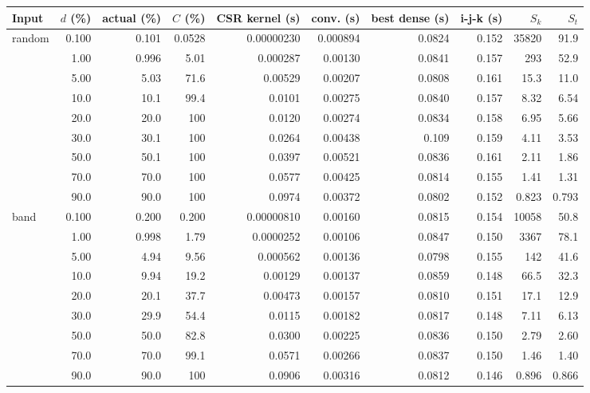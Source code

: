 \begin{tabular}{lrrrrrrrrr}
\toprule
Input & $d$ (\%) & actual (\%) & $C$ (\%) & CSR kernel (s) & conv. (s) & best dense (s) & i-j-k (s) & $S_k$ & $S_t$ \\
\midrule
random & 0.100 & 0.101 & 0.0528 & 0.00000230 & 0.000894 & 0.0824 & 0.152 & 35820 & 91.9 \\
 & 1.00 & 0.996 & 5.01 & 0.000287 & 0.00130 & 0.0841 & 0.157 & 293 & 52.9 \\
 & 5.00 & 5.03 & 71.6 & 0.00529 & 0.00207 & 0.0808 & 0.161 & 15.3 & 11.0 \\
 & 10.0 & 10.1 & 99.4 & 0.0101 & 0.00275 & 0.0840 & 0.157 & 8.32 & 6.54 \\
 & 20.0 & 20.0 & 100 & 0.0120 & 0.00274 & 0.0834 & 0.158 & 6.95 & 5.66 \\
 & 30.0 & 30.1 & 100 & 0.0264 & 0.00438 & 0.109 & 0.159 & 4.11 & 3.53 \\
 & 50.0 & 50.1 & 100 & 0.0397 & 0.00521 & 0.0836 & 0.161 & 2.11 & 1.86 \\
 & 70.0 & 70.0 & 100 & 0.0577 & 0.00425 & 0.0814 & 0.155 & 1.41 & 1.31 \\
 & 90.0 & 90.0 & 100 & 0.0974 & 0.00372 & 0.0802 & 0.152 & 0.823 & 0.793 \\
\midrule
band & 0.100 & 0.200 & 0.200 & 0.00000810 & 0.00160 & 0.0815 & 0.154 & 10058 & 50.8 \\
 & 1.00 & 0.998 & 1.79 & 0.0000252 & 0.00106 & 0.0847 & 0.150 & 3367 & 78.1 \\
 & 5.00 & 4.94 & 9.56 & 0.000562 & 0.00136 & 0.0798 & 0.155 & 142 & 41.6 \\
 & 10.0 & 9.94 & 19.2 & 0.00129 & 0.00137 & 0.0859 & 0.148 & 66.5 & 32.3 \\
 & 20.0 & 20.1 & 37.7 & 0.00473 & 0.00157 & 0.0810 & 0.151 & 17.1 & 12.9 \\
 & 30.0 & 29.9 & 54.4 & 0.0115 & 0.00182 & 0.0817 & 0.148 & 7.11 & 6.13 \\
 & 50.0 & 50.0 & 82.8 & 0.0300 & 0.00225 & 0.0836 & 0.150 & 2.79 & 2.60 \\
 & 70.0 & 70.0 & 99.1 & 0.0571 & 0.00266 & 0.0837 & 0.150 & 1.46 & 1.40 \\
 & 90.0 & 90.0 & 100 & 0.0906 & 0.00316 & 0.0812 & 0.146 & 0.896 & 0.866 \\
\bottomrule
\end{tabular}
